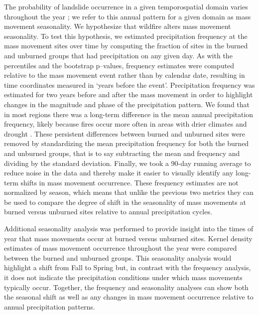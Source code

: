 \documentclass[nhess, manuscript]{copernicus}
\begin{document}
The probability of landslide occurrence in a given temporospatial domain varies 
throughout the year \citep{stanley2020building}; we refer to this annual pattern 
for a given domain as mass movement seasonality. We hypothesize that wildfire 
alters mass movement seasonality. To test this hypothesis, we estimated precipitation 
frequency at the mass movement sites over time by computing
the fraction of sites in the burned and unburned groups that had
precipitation on any given day. As with the percentiles and the bootstrap
p--values, frequency estimates were computed relative to the mass movement
event rather than by calendar date, resulting in time coordinates
measured in `years before the event'. Precipitation frequency was estimated for two years 
before and after the mass movement in order to highlight changes in the magnitude 
and phase of the precipitation pattern. We found that
in most regions there was a long-term difference in the mean annual
precipitation frequency, likely because fires occur more often in areas with drier
climates \citep{liuWildlandFireEmissions2014} and drought 
\citep{balling1992climate,gudmundsson2014predicting}. These persistent differences 
between burned and unburned sites were removed by standardizing the mean 
precipitation frequency for both the burned and unburned groups, that is 
to say subtracting the mean and frequency and dividing by the standard deviation. 
Finally, we took a
90-day running average to reduce noise in the data and thereby make it
easier to visually identify any long-term shifts in mass movement
occurrence. These frequency estimates are not normalized by season,
which means that unlike the previous two metrics they can be used to
compare the degree of shift in the seasonality of mass movements at burned
versus unburned sites relative to annual precipitation cycles.

Additional seasonality analysis was performed to provide insight into the times
of year that mass movements occur at burned versus unburned sites. Kernel density 
estimates of mass movement occurrence throughout the year were compared between the 
burned and unburned groups. This seasonality analysis would highlight a shift 
from Fall to Spring but, in contrast with the frequency analysis, it does not 
indicate the precipitation conditions under which mass movements typically occur. 
Together, the frequency and seasonality analyses can show both the seasonal 
shift as well as any changes in mass movement occurrence relative to annual 
precipitation patterns. 
\end{document}
